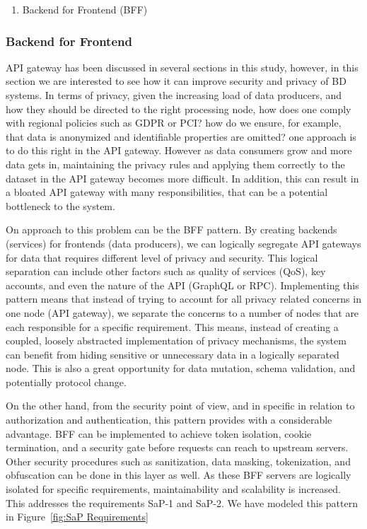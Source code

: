 \documentclass{bmcart}
\begin{document}
\begin{enumerate}
  \item Backend for Frontend (BFF)
\end{enumerate}

\subsubsection{Backend for Frontend}

API gateway has been discussed in several sections in this study, however, in this section we are interested to see how it can improve security and privacy of BD systems. In terms of privacy, given the increasing load of data producers, and how they should be directed to the right processing node, how does one comply with regional policies such as GDPR or PCI? how do we ensure, for example, that data is anonymized and identifiable properties are omitted? one approach is to do this right in the API gateway. However as data consumers grow and more data gets in, maintaining the privacy rules and applying them correctly to the dataset in the API gateway becomes more difficult. In addition, this can result in a bloated API gateway with many responsibilities, that can be a potential bottleneck to the system.

On approach to this problem can be the BFF pattern. By creating backends (services) for frontends (data producers), we can logically segregate API gateways for data that requires different level of privacy and security. This logical separation can include other factors such as quality of services (QoS), key accounts, and even the nature of the API (GraphQL or RPC). Implementing this pattern means that instead of trying to account for all privacy related concerns in one node (API gateway), we separate the concerns to a number of nodes that are each responsible for a specific requirement. This means, instead of creating a coupled, loosely abstracted implementation of privacy mechanisms, the system can benefit from hiding sensitive or unnecessary data in a logically separated node. This is also a great opportunity for data mutation, schema validation, and potentially protocol change.

On the other hand, from the security point of view, and in specific in relation to authorization and authentication, this pattern provides with a considerable advantage. BFF can be implemented to achieve token isolation, cookie termination, and a security gate before requests can reach to upstream servers. Other security procedures such as sanitization, data masking, tokenization, and obfuscation can be done in this layer as well. As these BFF servers are logically isolated for specific requirements, maintainability and scalability is increased. This addresses the requirements SaP-1 and SaP-2. We have modeled this pattern in Figure~\ref{fig:SaP Requirements}
\end{document}
